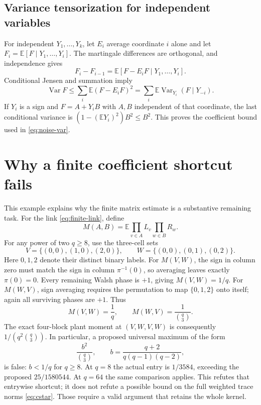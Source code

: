 \documentclass[11pt]{article}
\newcommand{\E}{\mathbb E}
\newcommand{\Var}{\operatorname{Var}}
\newcommand{\1}{\mathbf 1}
\begin{document}
\subsection{Variance tensorization for independent variables}
For independent $Y_1,\ldots,Y_k$, let $E_i$ average coordinate $i$
alone and let $F_i=\E[F\mid Y_1,\ldots,Y_i]$.
The martingale differences are orthogonal, and independence gives
\[
 F_i-F_{i-1}=\E[F-E_iF\mid Y_1,\ldots,Y_i].
\]
Conditional Jensen and summation imply
\[
 \Var F\le\sum_i\E(F-E_iF)^2
           =\sum_i\E\Var_{Y_i}(F\mid Y_{-i}).
\]
If $Y_i$ is a sign and $F=A+Y_iB$ with $A,B$ independent of that
coordinate, the last conditional variance is
$(1-(\E Y_i)^2)B^2\le B^2$. This proves the coefficient bound used
in \eqref{eq:noise-var}.

\section{Why a finite coefficient shortcut fails}\label{app:obstruction}
This example explains why the finite matrix estimate is a substantive
remaining task. For the link \eqref{eq:finite-link}, define
\[
 M(A,B)=\E\prod_{v\in A}L_v\prod_{w\in B}R_w.
\]
For any power of two $q\ge8$, use the three-cell sets
\[
 V=\{(0,0),(1,0),(2,0)\},\qquad
 W=\{(0,0),(0,1),(0,2)\}.
\]
Here $0,1,2$ denote their distinct binary labels.
For $M(V,W)$, the sign in column zero must match the sign in
column $\pi^{-1}(0)$, so averaging leaves exactly $\pi(0)=0$.
Every remaining Walsh phase is $+1$, giving $M(V,W)=1/q$.
For $M(W,V)$, sign averaging requires the permutation to map
$\{0,1,2\}$ onto itself; again all surviving phases are $+1$.
Thus
\[
             M(V,W)=\frac1q,\qquad
             M(W,V)=\frac1{\binom q3}.
\]
The exact four-block plant moment at $(V,W,V,W)$ is consequently
$1/(q^2\binom q3)$. In particular, a proposed universal maximum
of the form
\[
 \frac{b^2}{\binom q3},\qquad
 b=\frac{q+2}{q(q-1)(q-2)},
\]
is false: $b<1/q$ for $q\ge8$.
At $q=8$ the actual entry is $1/3584$, exceeding the proposed
$25/1580544$. At $q=64$ the same comparison applies.
This refutes that entrywise shortcut; it does not refute a possible
bound on the full weighted trace norms \eqref{eq:cstar}.
Those require a valid argument that retains the whole kernel.
\end{document}
